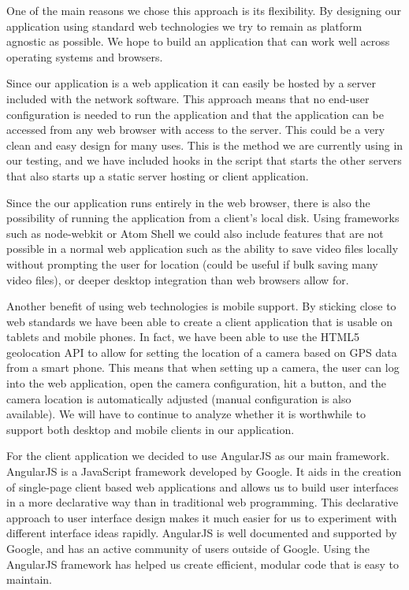 One of the main reasons we chose this approach is its flexibility. By designing
our application using standard web technologies we try to remain as platform
agnostic as possible. We hope to build an application that can work well across
operating systems and browsers.

Since our application is a web application it can easily be hosted by a server
included with the network software. This approach means that no end-user
configuration is needed to run the application and that the application can be
accessed from any web browser with access to the server. This could be a very
clean and easy design for many uses. This is the method we are currently using
in our testing, and we have included hooks in the script that starts the other
servers that also starts up a static server hosting or client application.

Since the our application runs entirely in the web browser, there is also the
possibility of running the application from a client's local disk. Using
frameworks such as node-webkit\cite{nw_home} or Atom Shell\cite{atom_home} we
could also include features that are not possible in a normal web application
such as the ability to save video files locally without prompting the user for
location (could be useful if bulk saving many video files), or deeper desktop
integration than web browsers allow for.

Another benefit of using web technologies is mobile support. By sticking close
to web standards we have been able to create a client application that is usable
on tablets and mobile phones. In fact, we have been able to use the HTML5
geolocation API to allow for setting the location of a camera based on GPS data
from a smart phone. This means that when setting up a camera, the user can log
into the web application, open the camera configuration, hit a button, and the
camera location is automatically adjusted (manual configuration is also
available). We will have to continue to analyze whether it is worthwhile to
support both desktop and mobile clients in our application.

For the client application we decided to use AngularJS\cite{angular_home} as our
main framework. AngularJS is a JavaScript framework developed by Google. It aids
in the creation of single-page client based web applications and allows us to
build user interfaces in a more declarative way than in traditional web
programming. This declarative approach to user interface design makes it much
easier for us to experiment with different interface ideas rapidly. AngularJS is
well documented and supported by Google, and has an active community of users
outside of Google. Using the AngularJS framework has helped us create efficient,
modular code that is easy to maintain.

